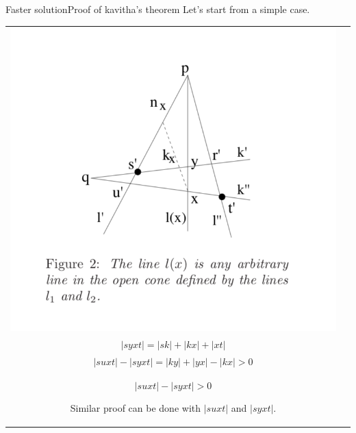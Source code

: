\documentclass{beamer}
\begin{document}
\begin{frame}{Faster solution}{Proof of kavitha's theorem}
    Let's start from a simple case. \\
    \begin{tabular}{c c}
        \begin{minipage}{0.4\textwidth}
            \includegraphics[width=\linewidth]{simple_proof.png}
        \end{minipage}  
        &  
        \begin{minipage}{0.5\textwidth}
            $|suxt| = |sk| + |ky| + |yx| + |xt| $ \\
            $|syxt| = |sk| + |kx| + |xt| $ \\
            $|suxt| - |syxt| = |ky| + |yx| - |kx| > 0 $ \\
            $$ |suxt| - |syxt| > 0 $$ 
            
            Similar proof can be done with $|suxt|$ and $|syxt|$.
        \end{minipage} 
    \end{tabular}
\end{frame}
\end{document}
